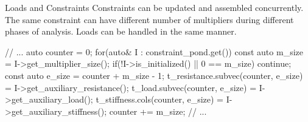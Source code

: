\documentclass[fleqn,10pt]{beamer}
\begin{document}
\begin{frame}[containsverbatim]{Loads and Constraints}
Constraints can be updated and assembled concurrently. The same constraint can have different number of multipliers during different phases of analysis. Loads can be handled in the same manner.
\begin{cppcode}
// ...
auto counter = 0;
for(auto& I : constraint_pond.get()) {
    const auto m_size = I->get_multiplier_size();
    if(!I->is_initialized() || 0 == m_size) continue;
    const auto e_size = counter + m_size - 1;
    t_resistance.subvec(counter, e_size) = I->get_auxiliary_resistance();
    t_load.subvec(counter, e_size) = I->get_auxiliary_load();
    t_stiffness.cols(counter, e_size) = I->get_auxiliary_stiffness();
    counter += m_size;
}
// ...
\end{cppcode}
\end{frame}
\end{document}
